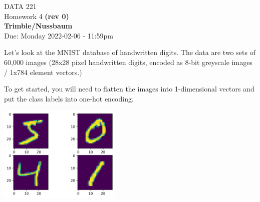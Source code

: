 \documentclass[12pt]{book}
\theoremstyle{definition}
\begin{document}
\begin{center}
{\Large DATA 221 \\  Homework 4  \textbf{(rev 0)}}\\
\textbf{Trimble/Nussbaum}\\ %
Due: Monday 2022-02-06  - 11:59pm
\end{center}

\vspace{0.2 cm}

Let's look at the MNIST database of handwritten digits.  The data are two sets of 60,000 images (28x28 pixel handwritten digits, encoded as 8-bit greyscale images / 1x784 element vectors.)

To get started, you will need to flatten the images into 1-dimensional vectors and put the class labels into one-hot encoding.

\includegraphics[width=2.3in]{src/MNIST.png}
\end{document}
